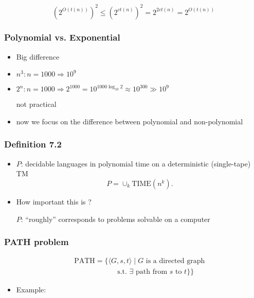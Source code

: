 \begin{frame}[allowframebreaks]
\begin{itemize}
\begin{equation*}
  (2^{O(t(n))})^2
\leq (2^{ct(n)})^2
= 2^{2ct(n)} 
= 2^{O(t(n))}
\end{equation*}

\end{itemize}\end{frame} \begin{frame}[allowframebreaks] \frametitle{Polynomial vs. Exponential}
  \begin{itemize}
\item Big difference
\item $n^3: n = 1000 \Rightarrow 10^9$
\item $2^n: n = 1000 \Rightarrow 2^{1000}
=10^{1000\log_{10}2}
\approx
10^{300}
\gg 10^9$

not practical
\item now we focus on the difference between polynomial
and non-polynomial
\end{itemize}\end{frame} \begin{frame}[allowframebreaks] \frametitle{Definition 7.2}
  \begin{itemize}
\item $P$: decidable languages in polynomial time
on a deterministic (single-tape) TM
\begin{equation*}
  P=\cup_k
\text{TIME}(n^k).
\end{equation*}
\item How important this is ?

$P$: ``roughly'' corresponds to problems solvable
on a computer



\end{itemize}\end{frame} \begin{frame}[allowframebreaks] \frametitle{PATH problem}
\begin{eqnarray*}
&&  \text{PATH}
=\{
\langle  G,s,t\rangle \mid \mbox{$G$ is a directed graph}\\
&& \qquad\qquad\qquad
\mbox{s.t. $\exists$ path from $s$ to $t$}\}
\}
\end{eqnarray*}
  \begin{itemize}
  \item Example:


\end{itemize}
\end{frame}
